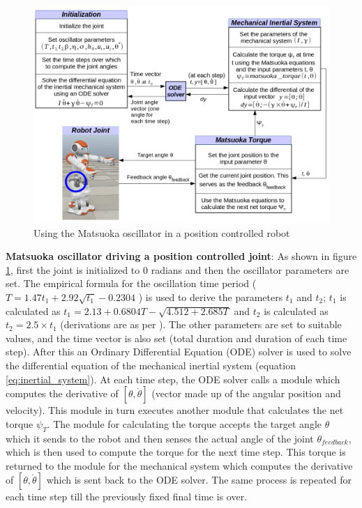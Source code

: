 \documentclass[12pt,twoside]{article}
\theoremstyle{plain}
\theoremstyle{definition}
\theoremstyle{remark}
\begin{document}
\begin{figure}[htbp]
\centering
\includegraphics[scale=0.45]{figures/robot_joint_control.png}
\caption{Using the Matsuoka oscillator in a position controlled robot}
\label{fig:robot_joint_control}
\end{figure}

\vspace{10pt}

\textbf{Matsuoka oscillator driving a position controlled joint}: As shown in figure \ref{fig:robot_joint_control}, first the joint is initialized to 0 radians and then the oscillator parameters are set. The empirical formula for the oscillation time period ($T=1.47t_1 + 2.92\sqrt{t_1} - 0.2304$ \cite{Ronsse2009}) is used to derive the parameters $t_1$ and $t_2$; $t_1$ is calculated as $t_1=2.13 + 0.6804T - \sqrt{4.512 + 2.685T}$ and $t_2$ is calculated as $t_2=2.5 \times t_1$ (derivations are as per \cite{Ronsse2009}). The other parameters are set to suitable values, and the time vector is also set (total duration and duration of each time step). After this an Ordinary Differential Equation (ODE) solver is used to solve the differential equation of the mechanical inertial system (equation \ref{eq:inertial_system}). At each time step, the ODE solver calls a module which computes the derivative of $[\theta, \dot{\theta}]$ (vector made up of the angular position and velocity). This module in turn executes another module that calculates the net torque $\psi_T$. The module for calculating the torque accepts the target angle $\theta$ which it sends to the robot and then senses the actual angle of the joint $\theta_{feedback}$, which is then used to compute the torque for the next time step. This torque is returned to the module for the mechanical system which computes the derivative of $[\theta, \dot{\theta}]$ which is sent back to the ODE solver. The same process is repeated for each time step till the previously fixed final time is over.\\
\end{document}
